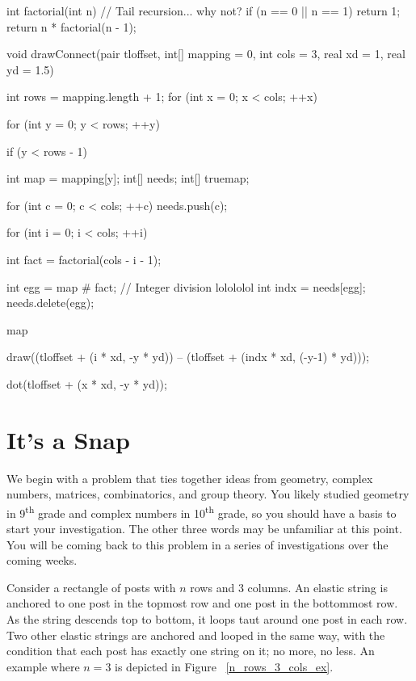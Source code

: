 \documentclass[../gatm.tex]{subfiles}
\begin{document}
\begin{asydef}

int factorial(int n) { // Tail recursion... why not?
	if (n == 0 || n == 1)
		return 1;
	return n * factorial(n - 1);
}

void drawConnect(pair tloffset, int[] mapping = {0}, int cols = 3, real xd = 1, real yd = 1.5) {
	int rows = mapping.length + 1;
	for (int x = 0; x < cols; ++x) {
		for (int y = 0; y < rows; ++y) {
			if (y < rows - 1) {
				int map = mapping[y];
				int[] needs;
				int[] truemap;
				
				for (int c = 0; c < cols; ++c) needs.push(c);
				
				for (int i = 0; i < cols; ++i) {
					int fact = factorial(cols - i - 1);
					
					int egg = map # fact; // Integer division lolololol
					int indx = needs[egg];
					needs.delete(egg);
					
					map %
					
					draw((tloffset + (i * xd, -y * yd)) -- (tloffset + (indx * xd, (-y-1) * yd)));
				}
			}
			
			dot(tloffset + (x * xd, -y * yd));
		}
	}
}

\end{asydef}

\section{It's a Snap}

\newcommand\snap{\bullet}

We begin with a problem that ties together ideas from geometry, complex numbers, matrices, combinatorics, and group theory. You likely studied geometry in 9\textsuperscript{th} grade and complex numbers in 10\textsuperscript{th} grade, so you should have a basis to start your investigation. The other three words may be unfamiliar at this point. You will be coming back to this problem in a series of investigations over the coming weeks.

Consider a rectangle of posts with $n$ rows and $3$ columns. An elastic string is anchored to one post in the topmost row and one post in the bottommost row. As the string descends top to bottom, it loops taut around one post in each row. Two other elastic strings are anchored and looped in the same way, with the condition that each post has exactly one string on it; no more, no less. An example where $n=3$ is depicted in Figure ~\ref{n_rows_3_cols_ex}.
\end{document}

